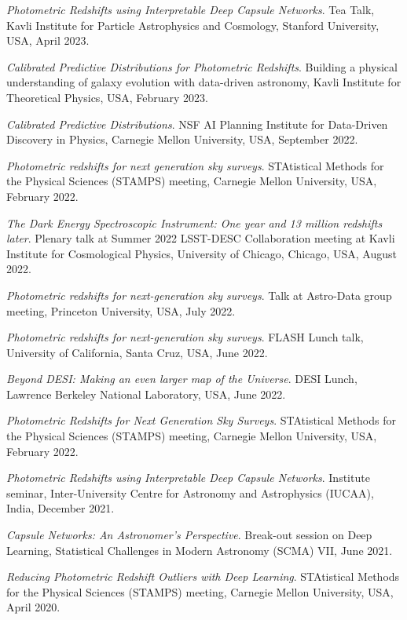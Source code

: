 \begin{etaremune}[leftmargin=40pt,labelsep=10pt]
    \item \textit{Photometric Redshifts using Interpretable Deep Capsule Networks}. Tea Talk, Kavli Institute for Particle Astrophysics and Cosmology, Stanford University, USA, April 2023.
    \item \textit{Calibrated Predictive Distributions for Photometric Redshifts}. Building a physical understanding of galaxy evolution with data-driven astronomy, Kavli Institute for Theoretical Physics, USA, February 2023.
    \item \textit{Calibrated Predictive Distributions}. NSF AI Planning Institute for Data-Driven Discovery in Physics, Carnegie Mellon University, USA, September 2022.
 
    \item \textit{Photometric redshifts for next generation sky surveys}. STAtistical Methods for the Physical Sciences (STAMPS) meeting, Carnegie Mellon University, USA, February 2022.
 
    \item \textit{The Dark Energy Spectroscopic Instrument: One year and 13 million redshifts later}. Plenary talk at Summer 2022 LSST-DESC Collaboration meeting at Kavli Institute for Cosmological Physics, University of Chicago, Chicago, USA, August 2022.
    \item \textit{Photometric redshifts for next-generation sky surveys}. Talk at Astro-Data group meeting, Princeton University, USA, July 2022.
    \item \textit{Photometric redshifts for next-generation sky surveys}. FLASH Lunch talk, University of California, Santa Cruz, USA, June 2022.
    \item \textit{Beyond DESI: Making an even larger map of the Universe}. DESI Lunch, Lawrence Berkeley National Laboratory, USA, June 2022.
    \item \textit{Photometric Redshifts for Next Generation Sky Surveys}. STAtistical Methods for the Physical Sciences (STAMPS) meeting, Carnegie Mellon University, USA, February 2022.
    \item \textit{Photometric Redshifts using Interpretable Deep Capsule Networks}. Institute seminar, Inter-University Centre for Astronomy and Astrophysics (IUCAA), India,  December 2021.
     \item \textit{Capsule Networks: An Astronomer's Perspective}. Break-out session on Deep Learning, Statistical Challenges in Modern Astronomy (SCMA) VII,  June 2021.
    \item \textit{Reducing Photometric Redshift Outliers with Deep Learning}. STAtistical Methods for the Physical Sciences (STAMPS) meeting, Carnegie Mellon University, USA, April 2020.
\end{etaremune}
